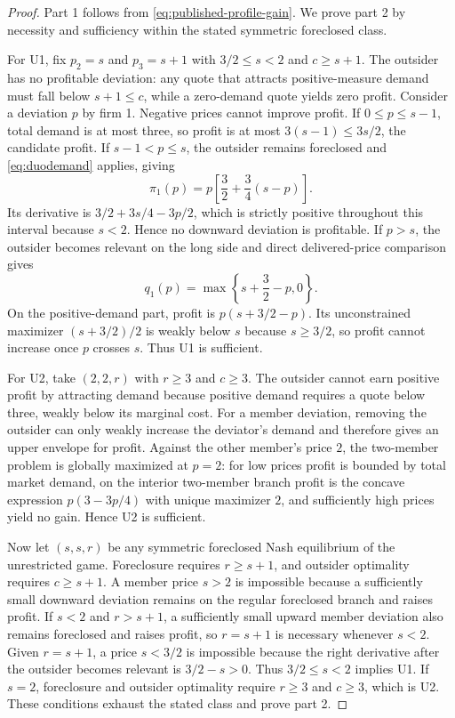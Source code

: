\begin{proof}
Part 1 follows from \eqref{eq:published-profile-gain}. We prove part 2 by necessity and sufficiency within the stated symmetric foreclosed class.

For U1, fix $p_2=s$ and $p_3=s+1$ with $3/2\leq s<2$ and $c\geq s+1$. The outsider has no profitable deviation: any quote that attracts positive-measure demand must fall below $s+1\leq c$, while a zero-demand quote yields zero profit. Consider a deviation $p$ by firm 1. Negative prices cannot improve profit. If $0\leq p\leq s-1$, total demand is at most three, so profit is at most $3(s-1)\leq3s/2$, the candidate profit. If $s-1<p\leq s$, the outsider remains foreclosed and \eqref{eq:duodemand} applies, giving
\[
 \pi_1(p)=p\left[\frac32+\frac34(s-p)\right].
\]
Its derivative is $3/2+3s/4-3p/2$, which is strictly positive throughout this interval because $s<2$. Hence no downward deviation is profitable. If $p>s$, the outsider becomes relevant on the long side and direct delivered-price comparison gives
\[
 q_1(p)=\max\left\{s+\frac32-p,0\right\}.
\]
On the positive-demand part, profit is $p(s+3/2-p)$. Its unconstrained maximizer $(s+3/2)/2$ is weakly below $s$ because $s\geq3/2$, so profit cannot increase once $p$ crosses $s$. Thus U1 is sufficient.

For U2, take $(2,2,r)$ with $r\geq3$ and $c\geq3$. The outsider cannot earn positive profit by attracting demand because positive demand requires a quote below three, weakly below its marginal cost. For a member deviation, removing the outsider can only weakly increase the deviator's demand and therefore gives an upper envelope for profit. Against the other member's price $2$, the two-member problem is globally maximized at $p=2$: for low prices profit is bounded by total market demand, on the interior two-member branch profit is the concave expression $p(3-3p/4)$ with unique maximizer $2$, and sufficiently high prices yield no gain. Hence U2 is sufficient.

Now let $(s,s,r)$ be any symmetric foreclosed Nash equilibrium of the unrestricted game. Foreclosure requires $r\geq s+1$, and outsider optimality requires $c\geq s+1$. A member price $s>2$ is impossible because a sufficiently small downward deviation remains on the regular foreclosed branch and raises profit. If $s<2$ and $r>s+1$, a sufficiently small upward member deviation also remains foreclosed and raises profit, so $r=s+1$ is necessary whenever $s<2$. Given $r=s+1$, a price $s<3/2$ is impossible because the right derivative after the outsider becomes relevant is $3/2-s>0$. Thus $3/2\leq s<2$ implies U1. If $s=2$, foreclosure and outsider optimality require $r\geq3$ and $c\geq3$, which is U2. These conditions exhaust the stated class and prove part 2.


\end{proof}
